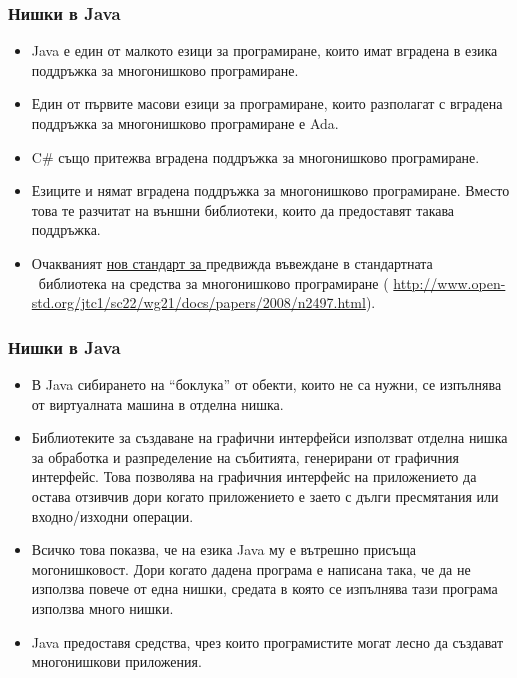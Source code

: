 \documentclass[ignorenonframetext, hyperref=unicode,compress]{beamer}
\begin{document}
\begin{frame}[containsverbatim]
\frametitle{Нишки в Java}
\begin{itemize}
\item Java е един от малкото езици за програмиране, които имат вградена
в езика поддръжка за многонишково програмиране.
\item Един от първите масови езици за програмиране,  които разполагат с
вградена поддръжка за многонишково програмиране е Ada.
\item C\# също притежва вградена поддръжка за многонишково програмиране.
\item Езиците {\CC} и {\Cpp} нямат вградена поддръжка за многонишково
програмиране. Вместо това те разчитат на външни библиотеки, които да
предоставят такава поддръжка.
\item Очакваният \href{http://en.wikipedia.org/wiki/C\%2B\%2B0x}{нов стандарт за
\Cpp} предвижда въвеждане в стандартната \Cpp\ библиотека на средства за
многонишково програмиране (%
\url{http://www.open-std.org/jtc1/sc22/wg21/docs/papers/2008/n2497.html}).
\end{itemize}
\end{frame}

\begin{frame}[containsverbatim]
\frametitle{Нишки в Java}
\begin{itemize}
\item В Java сибирането на ``боклука'' от обекти, които не са нужни, се
изпълнява от виртуалната машина в отделна нишка.
\item Библиотеките за създаване на графични интерфейси използват отделна нишка
за обработка и разпределение на събитията, генерирани от графичния интерфейс.
Това позволява на графичния интерфейс на приложението да остава отзивчив дори
когато приложението е заето с дълги пресмятания или входно/изходни операции.
\item Всичко това показва, че на езика Java му е вътрешно присъща
могонишковост. Дори когато дадена програма е написана така, че да не използва
повече от една нишки, средата в която се изпълнява тази програма използва много
нишки.
\item Java предоставя средства, чрез които програмистите могат лесно да създават
многонишкови приложения.
\end{itemize}
\end{frame}
\end{document}
